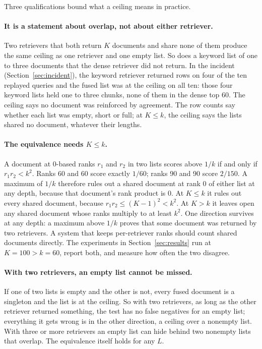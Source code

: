 \documentclass[11pt]{article}
\begin{document}
Three qualifications bound what a ceiling means in practice.

\paragraph{It is a statement about overlap, not about either retriever.} Two retrievers that both return $K$ documents and share none of them produce the same ceiling as one retriever and one empty list. So does a keyword list of one to three documents that the dense retriever did not return. In the incident (Section~\ref{sec:incident}), the keyword retriever returned rows on four of the ten replayed queries and the fused list was at the ceiling on all ten: those four keyword lists held one to three chunks, none of them in the dense top 60. The ceiling says no document was reinforced by agreement. The row counts say whether each list was empty, short or full; at $K \le k$, the ceiling says the lists shared no document, whatever their lengths.

\paragraph{The equivalence needs $K \le k$.} A document at 0-based ranks $r_1$ and $r_2$ in two lists scores above $1/k$ if and only if $r_1 r_2 < k^2$. Ranks 60 and 60 score exactly $1/60$; ranks 90 and 90 score $2/150$. A maximum of $1/k$ therefore rules out a shared document at rank 0 of either list at any depth, because that document's rank product is 0. At $K \le k$ it rules out every shared document, because $r_1 r_2 \le (K-1)^2 < k^2$. At $K > k$ it leaves open any shared document whose ranks multiply to at least $k^2$. One direction survives at any depth: a maximum above $1/k$ proves that some document was returned by two retrievers. A system that keeps per-retriever ranks should count shared documents directly. The experiments in Section~\ref{sec:results} run at $K = 100 > k = 60$, report both, and measure how often the two disagree.

\paragraph{With two retrievers, an empty list cannot be missed.} If one of two lists is empty and the other is not, every fused document is a singleton and the list is at the ceiling. So with two retrievers, as long as the other retriever returned something, the test has no false negatives for an empty list; everything it gets wrong is in the other direction, a ceiling over a nonempty list. With three or more retrievers an empty list can hide behind two nonempty lists that overlap. The equivalence itself holds for any $L$.
\end{document}
